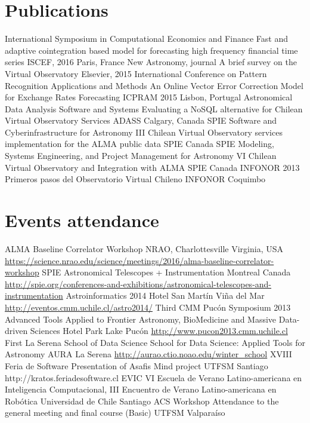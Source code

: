 \documentclass[11pt,a4paper]{moderncv}
\begin{document}
\section{Publications}
	{International Symposium in Computational Economics and Finance}
	{Fast and adaptive cointegration based model for forecasting high frequency financial time series}
	{ISCEF, 2016}
	{Paris, France}
	{}
	{New Astronomy, journal}
	{A brief survey on the Virtual Observatory}
	{Elsevier, 2015}
	{}
	{}
	{International Conference on Pattern Recognition Applications and Methods}
	{An Online Vector Error Correction Model for Exchange Rates Forecasting}
	{ICPRAM 2015}
	{Lisbon, Portugal}
	{}
	{Astronomical Data Analysis Software and Systems }
	{Evaluating a NoSQL alternative for Chilean Virtual Observatory Services}
	{ADASS}
	{Calgary, Canada}
	{}
	{SPIE Software and Cyberinfrastructure for Astronomy III}
	{Chilean Virtual Observatory services implementation for the ALMA public data}
	{SPIE}
	{Canada}
	{}
	{SPIE Modeling, Systems Engineering, and Project Management for Astronomy VI}
	{Chilean Virtual Observatory and Integration with ALMA}
	{SPIE}
	{Canada}
	{}
	{INFONOR 2013}
	{Primeros pasos del Observatorio Virtual Chileno}
	{INFONOR}
	{Coquimbo}
	{}

\section{Events attendance}
	{ALMA Baseline Correlator Workshop}
	{}
	{NRAO, Charlottesville}
	{Virginia, USA}
	{\url{https://science.nrao.edu/science/meetings/2016/alma-baseline-correlator-workshop}}
	{SPIE Astronomical Telescopes + Instrumentation}
	{}
	{Montreal}
	{Canada}
	{\url{http://spie.org/conferences-and-exhibitions/astronomical-telescopes-and-instrumentation}}
	{Astroinformatics 2014}
	{}
	{Hotel San Martín}
	{Viña del Mar}
	{\url{http://eventos.cmm.uchile.cl/astro2014/}}
	{Third CMM Pucón Symposium 2013}
	{Advanced Tools Applied to Frontier Astronomy, BioMedicine and Massive Data-driven Sciences}
	{Hotel Park Lake}
	{Pucón}
	{\url{http://www.pucon2013.cmm.uchile.cl}}
	{First La Serena School of Data Science}
	{School for Data Science: Applied Tools for Astronomy}
	{AURA}
	{La Serena}
	{\url{http://aurao.ctio.noao.edu/winter_school}}
	{XVIII Feria de Software}
	{Presentation of Asafis Mind project}
	{UTFSM}
	{Santiago}
	{http://kratos.feriadesoftware.cl}
	{EVIC}
	{VI Escuela de Verano Latino-americana en Inteligencia Computacional, III Encuentro de Verano Latino-americana en Robótica}
	{Universidad de Chile}
	{Santiago}
	{}
	{ACS Workshop}
	{Attendance to the general meeting and final course (Basic)}
	{UTFSM}
	{Valparaíso}
	{}
\end{document}
